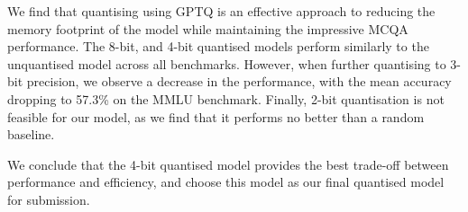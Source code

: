 We find that quantising using GPTQ is an effective approach to reducing the
memory footprint of the model while maintaining the impressive MCQA performance. The 8-bit, and 4-bit quantised models perform similarly to the unquantised model across all benchmarks. However, when further quantising to 3-bit precision, we observe a decrease in the performance, with the mean accuracy dropping to 57.3\% on the MMLU benchmark. Finally, 2-bit quantisation is not feasible for our model, as we find that it performs no better than a random baseline.

We conclude that the 4-bit quantised model provides the best trade-off between
performance and efficiency, and choose this model as our final quantised model
for submission.

